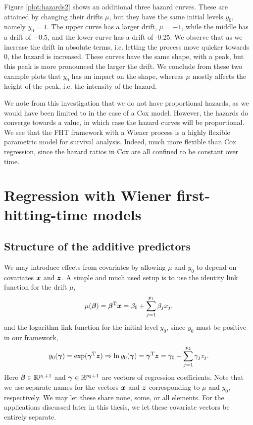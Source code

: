 Figure \ref{plot:hazards2} shows an additional three hazard curves.
These are attained by changing their drifts $\mu$, but they have the same initial levels $y_0$, namely $y_0=1$.
The upper curve has a larger drift, $\mu=-1$, while the middle has a drift of $-0.5$, and the lower curve has a drift of -0.25.
We observe that as we increase the drift in absolute terms, i.e. letting the process move quicker towards 0, the hazard is increased.
These curves have the same shape, with a peak, but this peak is more pronounced the larger the drift.
We conclude from these two example plots that $y_0$ has an impact on the shape, whereas $\mu$ mostly affects the height of the peak, i.e. the intensity of the hazard.

We note from this investigation that we do not have proportional hazards, as we would have been limited to in the case of a Cox model.
However, the hazards do converge towards a value, in which case the hazard curves will be proportional.
We see that the FHT framework with a Wiener process is a highly flexible parametric model for survival analysis. Indeed, much more flexible than Cox regression, since the hazard ratios in Cox are all confined to be constant over time.

\section{Regression with Wiener first-hitting-time models}
\subsection{Structure of the additive predictors}
\label{subsec:IG-reg}
We may introduce effects from covariates by allowing $\mu$ and $y_0$ to depend on covariates $\bm{x}$ and $\bm{z}$.
A simple and much used setup \citep{leewhitmore2006, caroni2017} is to use the identity link function for the drift $\mu$,
\begin{equation}\label{eq:y0}
    \mu(\boldsymbol{\beta})=\boldsymbol{\beta}^{\text{T}}\bm{x}=\beta_0+\sum_{j=1}^{p_1} \beta_jx_j,
\end{equation}
and the logarithm link function for the initial level $y_0$, since $y_0$ must be positive in our framework,
\begin{equation}\label{eq:mu}
    y_0(\boldsymbol{\gamma})=\exp(\boldsymbol{\gamma}^{\text{T}}\bm{z})\Rightarrow\ln y_0(\boldsymbol{\gamma})=\boldsymbol{\gamma}^{\text{T}}\bm{z}=\gamma_0+\sum_{j=1}^{p_2} \gamma_jz_j.
\end{equation}
Here $\boldsymbol{\beta}\in\mathbb{R}^{p_1+1}$ and $\boldsymbol{\gamma}\in\mathbb{R}^{p_2+1}$ are vectors of regression coefficients.
Note that we use separate names for the vectors $\bm{x}$ and $\bm{z}$ corresponding to $\mu$ and $y_0$, respectively.
We may let these share none, some, or all elements.
For the applications discussed later in this thesis, we let these covariate vectors be entirely separate.

